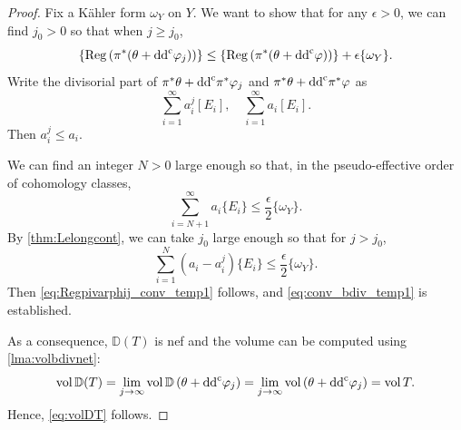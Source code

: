 \begin{proof}
    Fix a Kähler form $\omega_Y$ on $Y$. We want to show that for any $\epsilon>0$, we can find $j_0>0$ so that when $j\geq j_0$,
\begin{equation}\label{eq:Regpivarphij_conv_temp1}
\left\{\operatorname{Reg}\left(\pi^*(\theta+\mathrm{dd}^{\mathrm{c}}\varphi_j)\right)\right\}\leq \left\{\operatorname{Reg}\left(\pi^*(\theta+\mathrm{dd}^{\mathrm{c}}\varphi)\right)\right\}+\epsilon\{\omega_Y\}.
\end{equation}
Write the divisorial part of $\pi^*\theta+\mathrm{dd}^{\mathrm{c}} \pi^*\varphi_j$ and $\pi^*\theta+\mathrm{dd}^{\mathrm{c}} \pi^*\varphi$ as
\[
\sum_{i=1}^{\infty}a_i^j [E_i],\quad \sum_{i=1}^{\infty}a_i [E_i].
\]
Then $a_i^j\leq a_i$.

We can find an integer $N>0$ large enough so that, in the pseudo-effective order of cohomology classes,
\[
\sum_{i=N+1}^{\infty}a_i \{E_i\}\leq \frac{\epsilon}{2}\{\omega_Y\}.
\]
By \cref{thm:Lelongcont}, we can take $j_0$ large enough so that for $j>j_0$,
\[
\sum_{i=1}^{N}(a_i-a_i^j)\{E_i\}\leq \frac{\epsilon}{2}\{\omega_Y\}.
\]
Then \eqref{eq:Regpivarphij_conv_temp1} follows, and \eqref{eq:conv_bdiv_temp1} is established.

As a consequence, $\mathbb{D}(T)$ is nef and the volume can be computed using \cref{lma:volbdivnet}:
\[
\operatorname{vol}\mathbb{D}(T)=\lim_{j\to\infty}\operatorname{vol} \mathbb{D}\left( \theta+\mathrm{dd}^{\mathrm{c}}\varphi_j \right)=\lim_{j\to\infty}\operatorname{vol} \left(\theta+\mathrm{dd}^{\mathrm{c}}\varphi_j\right)=\operatorname{vol} T.
\]
Hence, \eqref{eq:volDT} follows.
\end{proof}


